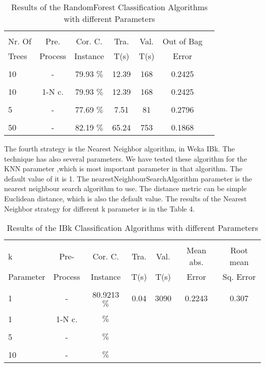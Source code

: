 \documentclass[a4paper]{article}
\begin{document}
\begin{table}
\begin{tabular}{|l| c | c | c | c |c |c |}

\hline & & & & & \\
Nr. Of & Pre. & Cor. C.& Tra. & Val. & Out of Bag  \\
Trees & Process & Instance & T(s) &  T(s) & Error  \\
\hline & & & & & \\
10	 & - &			79.93  $\%$ & 12.39 & 168 & 0.2425  \\ 
\hline & & & & & \\
10 	 & 1-N c. &	79.93  $\%$ & 12.39 & 168 & 0.2425  \\ 
\hline & & & & & \\
5 	& - &			77.69 $\%$ & 7.51 & 81 & 0.2796   \\ 
\hline & & & & &  \\
50 	 & - &			82.19  $\%$ & 65.24 & 753 &  0.1868 \\ 
\hline
\end{tabular}
\caption{Results of the RandomForest Classification Algorithms with different Parameters}
\end{table}

The fourth strategy is the  Nearest Neighbor algorithm, in Weka IBk. The technique has also several parameters. We have tested these algorithm for the KNN parameter ,which is most important parameter in that algorithm. The default value of it is 1. The nearestNeighbourSearchAlgorithm parameter is the nearest neighbour search algorithm to use. The distance metric can be simple Euclidean distance, which is also the default value. The results of the  Nearest Neighbor  strategy for different k parameter is in the Table 4.

\begin{table}
\begin{tabular}{|l| c | c | c | c |c |c |}

\hline & & & & & & \\
k &  Pre- & Cor. C. & Tra. & Val. & Mean abs.  & Root mean \\
Parameter& Process & Instance & T(s) &  T(s) & Error & Sq. Error \\
\hline & & & & & & \\
1 	 & - &			80.9213		   $\%$ &	0.04		& 	3090	 & 	0.2243	 & 0.307  \\ 
\hline & & & & & & \\	
1 	 & 1-N c.  &				   $\%$ &			& 		 & 		 &  \\ 
\hline & & & & & & \\
5	 & - &		  			 $\%$ &			& 		 & 		 &  \\ 
\hline & & & & & & \\	
10	 & - &		  			 $\%$ &			& 		 & 		 &  \\ 
\hline
\end{tabular}
\caption{Results of the IBk Classification Algorithms with different Parameters}
\end{table}
\end{document}

